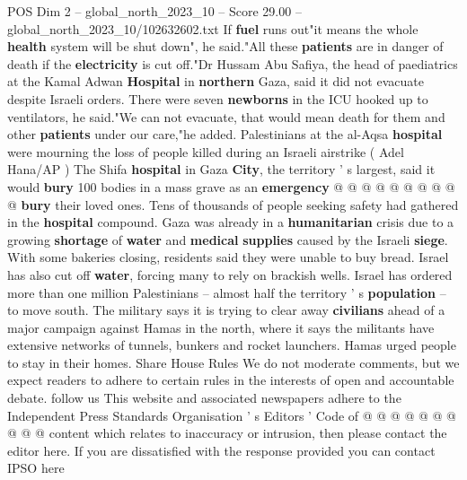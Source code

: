 \begin{textsample}{POS Dim 2 – global\_north\_2023\_10 – Score 29.00 – global\_north\_2023\_10/102632602.txt}
If \textbf{fuel} runs out"it means the whole \textbf{health} system will be shut down", he said."All these \textbf{patients} are in danger of death if the \textbf{electricity} is cut off."Dr Hussam Abu Safiya, the head of paediatrics at the Kamal Adwan \textbf{Hospital} in \textbf{northern} Gaza, said it did not evacuate despite Israeli orders.
There were seven \textbf{newborns} in the ICU hooked up to ventilators, he said."We can not evacuate, that would mean death for them and other \textbf{patients} under our care,"he added.
Palestinians at the al-Aqsa \textbf{hospital} were mourning the loss of people killed during an Israeli airstrike ( Adel Hana/AP ) The Shifa \textbf{hospital} in Gaza \textbf{City}, the territory ' s largest, said it would \textbf{bury} 100 bodies in a mass grave as an \textbf{emergency} @ @ @ @ @ @ @ @ @ @ \textbf{bury} their loved ones.
Tens of thousands of people seeking safety had gathered in the \textbf{hospital} compound.
Gaza was already in a \textbf{humanitarian} crisis due to a growing \textbf{shortage} of \textbf{water} and \textbf{medical} \textbf{supplies} caused by the Israeli \textbf{siege}.
With some bakeries closing, residents said they were unable to buy bread.
Israel has also cut off \textbf{water}, forcing many to rely on brackish wells.
Israel has ordered more than one million Palestinians -- almost half the territory ' s \textbf{population} -- to move south.
The military says it is trying to clear away \textbf{civilians} ahead of a major campaign against Hamas in the north, where it says the militants have extensive networks of tunnels, bunkers and rocket launchers.
Hamas urged people to stay in their homes.
Share House Rules We do not moderate comments, but we expect readers to adhere to certain rules in the interests of open and accountable debate. follow us This website and associated newspapers adhere to the Independent Press Standards Organisation ' s Editors ' Code of @ @ @ @ @ @ @ @ @ @ content which relates to inaccuracy or intrusion, then please contact the editor here.
If you are dissatisfied with the response provided you can contact IPSO here

\end{textsample}
